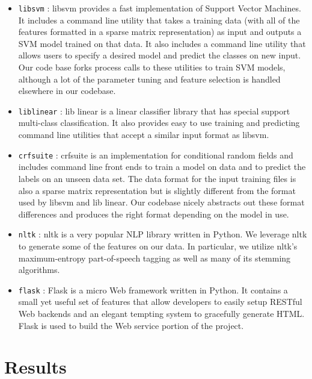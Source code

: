 \documentclass[preprint]{style}
\begin{document}
\begin{itemize}

\item {\tt libsvm} \cite{libsvm}: libsvm provides a fast implementation of Support Vector Machines. It includes a command line utility that takes a training data (with all of the features formatted in a sparse matrix representation) as input and outputs a SVM model trained on that data. It also includes a command line utility that allows users to specify a desired model and predict the classes on new input. Our code base forks process calls to these utilities to train SVM models, although a lot of the parameter tuning and feature selection is handled elsewhere in our codebase.

\item {\tt liblinear} \cite{liblinear}: lib linear is a linear classifier library that has special support multi-class classification. It also provides easy to use training and predicting command line utilities that accept a similar input format as libsvm.

\item {\tt crfsuite} \cite{crfsuite}: crfsuite is an implementation for conditional random fields and includes command line front ends to train a model on data and to predict the labels on an unseen data set. The data format for the input training files is also a sparse matrix representation but is slightly different from the format used by libsvm and lib linear. Our codebase nicely abstracts out these format differences and produces the right format depending on the model in use.

\item {\tt nltk} \cite{nltk}: nltk is a very popular NLP library written in Python. We leverage nltk to generate some of the features on our data. In particular, we utilize nltk's maximum-entropy part-of-speech tagging as well as many of its stemming algorithms.

\item {\tt flask} \cite{flask}: Flask is a micro Web framework written in Python. It contains a small yet useful set of features that allow developers to easily setup RESTful Web backends and an elegant tempting system to gracefully generate HTML. Flask is used to build the Web service portion of the project.

\end{itemize}
	

\section{Results}
\end{document}
